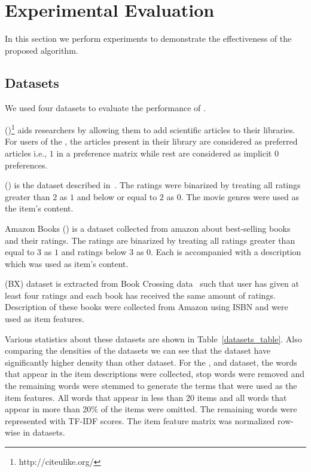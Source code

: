 
\section{Experimental Evaluation} \label{ch:bilinear:experiments}

In this section we perform experiments to 
demonstrate the effectiveness of the proposed algorithm. 

\subsection{Datasets}
We used four datasets to evaluate the performance of \CF.

\CULEXP (\CUL)\footnote{http://citeulike.org/} aids researchers by allowing
them to add scientific articles to their libraries. For users of the \CUL, the
articles present in their library are considered as preferred articles i.e., $1$
in a preference matrix while rest are considered as implicit $0$ preferences. 

\MLHREXP (\MLHR) is the dataset described in~\cite{cantador11}. The ratings were
binarized by treating all ratings greater than $2$ as $1$ and below or equal 
to $2$ as $0$. The movie genres were used as the item's content. 
 
Amazon Books (\AMAZON) is a dataset collected from amazon about best-selling books
and their ratings. The ratings are binarized by treating all ratings greater
than equal to $3$ as $1$ and ratings below $3$ as $0$. Each is accompanied with a
description which was used as item's content.


\BX (BX) dataset is extracted from Book Crossing
data~\cite{ziegler05www} such
that user has given at least four ratings and each book has received the same
amount of ratings. Description of these books were collected from Amazon using
ISBN and were used as item features.

Various statistics about these datasets are shown in Table~\ref{datasets_table}.
Also comparing the densities of the datasets we can see that the \MLHREXP dataset 
have significantly higher density than other dataset.
For the \AMAZON, \CUL and \BX dataset, the words that appear in the item descriptions were
collected, stop words were removed and the remaining words were stemmed to
generate the terms that were used as the item features. All words that appear in
less than 20 items and all words that appear in more than 20\% of the items were
omitted. The remaining words were represented with TF-IDF scores. The item
feature matrix was normalized row-wise in datasets. 


